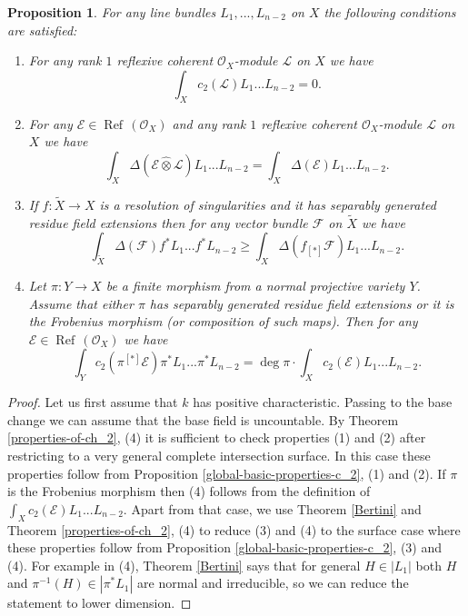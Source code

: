 \documentclass[twoside, 11pt]{article}
\theoremstyle{plain}
\newtheorem{Proposition}[Thm]{\sc Proposition}
\theoremstyle{definition}
\theoremstyle{remark}
\newcommand{\cE}{{\mathcal E}}
\newcommand{\cF}{{\mathcal F}}
\newcommand{\cL}{{\mathcal L}}
\newcommand{\cO}{{\mathcal O}}
\newcommand{\Refl}{{\mathop{\operatorname{Ref}\, }}}
\begin{document}
\begin{Proposition}\label{further-properties-char-p}
For any  line bundles $L_1,..., L_{n-2}$ on $X$ the following conditions are satisfied:
\begin{enumerate}
\item For any rank $1$ reflexive coherent $\cO_X$-module $\cL$ on $X$ we have $$\int _X c_2 (\cL)L_1...L_{n-2}=0.$$
\item For any $\cE\in \Refl(\cO_X) $  and any rank $1$ reflexive coherent $\cO_X$-module $\cL$ on $X$ we have
$$ \int_X \Delta (\cE \hat \otimes \cL)L_1...L_{n-2}=\int_X \Delta (\cE) L_1...L_{n-2}.$$
\item If $f: \tilde X\to X$ is a resolution of singularities and it has separably generated residue field extensions
then for any vector bundle $\cF$ on $\tilde X$ we have
$$\int_{\tilde X} \Delta ( \cF)f^*L_1...f^*L_{n-2} \ge  \int_{X} \Delta ( f_{[*]}\cF) L_1...L_{n-2}. $$
\item Let  $ \pi: Y\to X$ be a finite morphism from a normal  projective variety $Y$. Assume that either $\pi$ has separably generated residue field extensions or it is  the Frobenius morphism (or composition of such maps).
Then for any $\cE\in \Refl(\cO_X) $ we have
$$\int_Yc_2 ( \pi ^{[*]}\cE) \pi^*L_1...\pi^*L_{n-2}= \deg \pi \cdot \int_Xc_2(\cE)L_1...L_{n-2}.$$
\end{enumerate}
\end{Proposition}

\begin{proof}
Let us first assume that $k$ has positive characteristic. Passing to the base change we can assume that the base field is uncountable. By Theorem \ref{properties-of-ch_2}, (4) it is sufficient to check  properties (1) and (2)
after restricting to a very general complete intersection surface. In this case these properties follow from Proposition \ref{global-basic-properties-c_2}, (1) and (2). If $\pi$ is the Frobenius morphism then (4) follows from the definition of  
$\int_Xc_2(\cE)L_1...L_{n-2}.$ Apart from that case, we use Theorem \ref{Bertini} and Theorem \ref{properties-of-ch_2}, (4)  to reduce (3) and (4) to the surface case where these properties follow from Proposition \ref{global-basic-properties-c_2}, (3) and (4). For example in (4), Theorem \ref{Bertini} says that for  general $H\in |L_1|$  both $H$ and $\pi^{-1}(H)\in |\pi^*L_1|$ are normal and irreducible, so we can reduce the statement to lower dimension.
\end{proof}


\medskip
\end{document}
